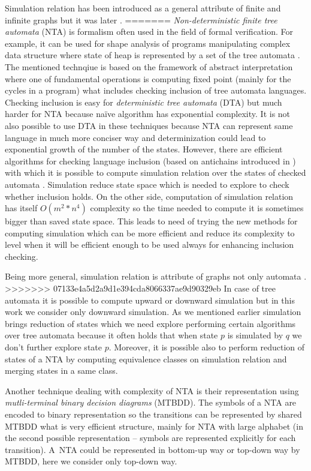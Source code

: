 \documentclass[a4paper, 12pt]{article}
\begin{document}
Simulation relation has been introduced as a general attribute of finite and infinite graphs \cite{focs95}
but it was later .
=======
\textit{Non-deterministic finite tree automata} (NTA) is formalism often used in the field of formal verification.
For example, it can be used for shape analysis of programs manipulating complex data structure where
state of heap is represented by a set of the tree automata \cite{methods12}.
The mentioned technqiue is based on the framework of abstract interpretation where one of fundamental
operations is computing fixed point (mainly for the cycles in a program) what includes checking inclusion of
tree automata languages.
Checking inclusion is easy for \textit{deterministic tree automata} (DTA) but much harder for NTA because
na{\"i}ve algorithm has exponential complexity.
It is not also possible to use DTA in these techniques because NTA can represent same language in much more
conciser way and determinization could lead to exponential growth of the  number of the states.
However, there are efficient algorithms for checking language inclusion (based on antichains introduced in \cite{tacas10})
with which it is possible to compute simulation relation over the states of checked automata \cite{tacas10}. %
Simulation reduce state space which is needed to explore to check whether inclusion holds.
On the other side, computation of simulation relation has itself $O(m^2*n^4)$ complexity so the time needed %
to compute it is sometimes bigger than saved state space.
This leads to need of trying the new methods for computing simulation which can be more efficient and
reduce its complexity to level when it will be efficient enough to be used always for enhancing inclusion checking. 

Being more general, simulation relation is attribute of graphs not only automata \cite{focs95, tacas08}.
>>>>>>> 07133e4a5d2a9d1e394cda8066337ae9d90329eb
In case of tree automata it is possible to compute upward or downward simulation but in this
work we consider only downward simulation.
As we mentioned earlier simulation brings reduction of states which we need explore performing
certain algorithms over tree automata because it often holds that when state $p$ is simulated by $q$
we don't further explore state $p$.
Moreover, it is possible also to perform reduction of states of a NTA by computing
equivalence classes on simulation relation and merging states in a same class.

Another technique dealing with complexity of NTA is their representation using \textit{mutli-terminal binary decision diagrams} (MTBDD).
The symbols of a NTA are encoded to binary representation so the transitions can be represented by shared MTBDD what is very  efficient structure,  mainly for NTA with large alphabet
(in the second possible representation -- symbols are represented explicitly for each transition).
A~NTA could be represented in bottom-up way or top-down way by MTBDD, here we consider only top-down way.
\end{document}
